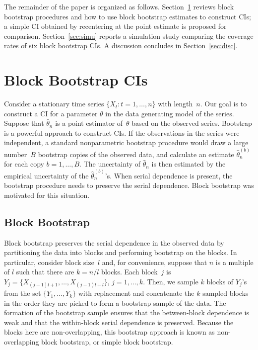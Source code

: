\documentclass[12pt, letterpaper, titlepage]{article}
\begin{document}
The remainder of the paper is organized as follows.
Section~\ref{sec:bbci} reviews block bootstrap procedures and how to use block
bootstrap estimates to construct CIs; a simple CI obtained by recentering at the
point estimate is proposed for comparison. Section~\ref{sec:simu} reports a
simulation
study comparing the coverage rates of six block bootstrap CIs. A discussion
concludes in Section~\ref{sec:disc}.


\section{Block Bootstrap CIs}
\label{sec:bbci}


Consider a stationary time series $\{X_t: t = 1, \ldots, n\}$ with length~$n$.
Our goal is to construct a CI for a parameter $\theta$ in the
data generating model of the series. Suppose that $\hat\theta_n$ is a point
estimator of~$\theta$ based on the observed series. Bootstrap is a powerful
approach to construct CIs. If the observations in the series
were independent, a standard nonparametric bootstrap procedure would draw a
large number~$B$ bootstrap copies of the observed data, and calculate an
estimate $\hat\theta_n^{(b)}$ for each copy $b = 1, \ldots, B$. The uncertainty
of $\hat\theta_n$ is then estimated by the empirical uncertainty of the
$\hat\theta_n^{(b)}$'s. When serial dependence is present, the bootstrap
procedure needs to preserve the serial dependence. Block bootstrap was
motivated for this situation. 


\subsection{Block Bootstrap}


Block bootstrap preserves the serial dependence in the observed data by
partitioning the data into blocks and performing bootstrap on the blocks.
In particular, consider block size~$l$ and, for convenience, suppose that
$n$ is a multiple of $l$ such that there are $k = n / l$ blocks. Each block~$j$
is $Y_j = \{X_{(j - 1) l + 1}, \ldots, X_{(j - 1) l + l}\}$,
$j = 1, \ldots,   k$.  Then, we sample $k$ blocks of $Y_j$'s from the set 
$\{Y_1, \ldots, Y_k\}$ with replacement and concatenate the $k$ sampled blocks
in the order they are picked to form a bootstrap sample of the data. The
formation of the bootstrap sample ensures that the between-block dependence
is weak and that the within-block serial dependence is preserved. Because the
blocks here are non-overlapping, this bootstrap approach is known as
non-overlapping block bootstrap, or simple block bootstrap.
\end{document}
